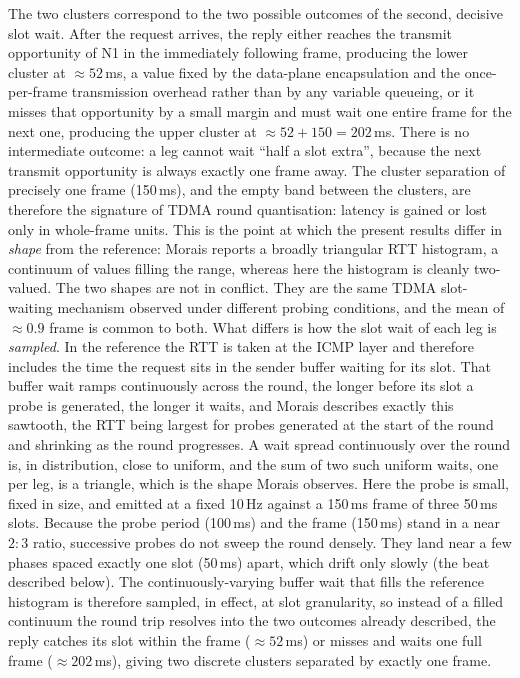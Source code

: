 The two clusters correspond to the two possible outcomes of the second, decisive
slot wait. After the request arrives, the reply either reaches the transmit
opportunity of N1 in the immediately following frame, producing the lower cluster
at $\approx 52$\,ms, a value fixed by the data-plane encapsulation and the
once-per-frame transmission overhead rather than by any variable queueing,
or it misses that opportunity by a small margin and must wait one entire frame
for the next one, producing the upper cluster at $\approx 52 + 150 = 202$\,ms.
There is no intermediate outcome: a leg cannot wait ``half a slot extra'',
because the next transmit opportunity is always exactly one frame away. The
cluster separation of precisely one frame (150\,ms), and the empty band between
the clusters, are therefore the signature of TDMA round quantisation: latency
is gained or lost only in whole-frame units. This is the point at which the
present results differ in \emph{shape} from the reference: Morais reports a
broadly triangular RTT histogram, a continuum of values filling the range,
whereas here the histogram is cleanly two-valued. The two shapes are not in
conflict. They are the same TDMA slot-waiting mechanism observed under
different probing conditions, and the mean of $\approx 0.9$ frame is common to
both. What differs is how the slot wait of each leg is \emph{sampled}. In the
reference the RTT is taken at the ICMP layer and therefore includes the time
the request sits in the sender buffer waiting for its slot. That buffer wait
ramps continuously across the round, the longer before its slot a probe is
generated, the longer it waits, and Morais describes exactly this sawtooth,
the RTT being largest for probes generated at the start of the round and
shrinking as the round progresses. A wait spread continuously over the round
is, in distribution, close to uniform, and the sum of two such uniform waits,
one per leg, is a triangle, which is the shape Morais observes. Here the probe
is small, fixed in size, and emitted at a fixed 10\,Hz against a 150\,ms frame
of three 50\,ms slots. Because the probe period (100\,ms) and the frame
(150\,ms) stand in a near $2{:}3$ ratio, successive probes do not sweep the
round densely. They land near a few phases spaced exactly one slot (50\,ms)
apart, which drift only slowly (the beat described below). The
continuously-varying buffer wait that fills the reference histogram is
therefore sampled, in effect, at slot granularity, so instead of a filled
continuum the round trip resolves into the two outcomes already described, the
reply catches its slot within the frame ($\approx 52$\,ms) or misses and waits
one full frame ($\approx 202$\,ms), giving two discrete clusters separated by
exactly one frame.


